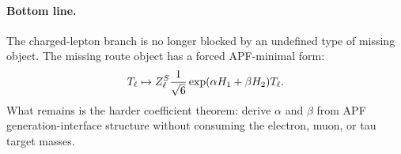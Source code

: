 \paragraph{Bottom line.}
The charged-lepton branch is no longer blocked by an undefined type of missing object.  The missing route object has a forced APF-minimal form:
\[
        T_\ell\mapsto
        Z_\ell^S{1\over\sqrt6}
        \exp(\alpha H_1+\beta H_2)T_\ell.
\]
What remains is the harder coefficient theorem: derive \(\alpha\) and \(\beta\) from APF generation-interface structure without consuming the electron, muon, or tau target masses.
